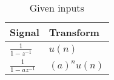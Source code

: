 
\begin{table}[htbp]
    \centering
    \renewcommand{\arraystretch}{1.5}
    \begin{tabular}{|p{2.5cm}|p{3cm}|}
        \hline
        \textbf{Signal} & \textbf{Transform} \\
        \hline
        $\frac{1}{1-z^{-1}}$ & $u(n)$ \\
        \hline
        $\frac{1}{1-az^{-1}}$ & $(a)^{n}u(n)$ \\
        \hline
    \end{tabular}
    \caption{Given inputs}
    \label{pairs}
\end{table}
